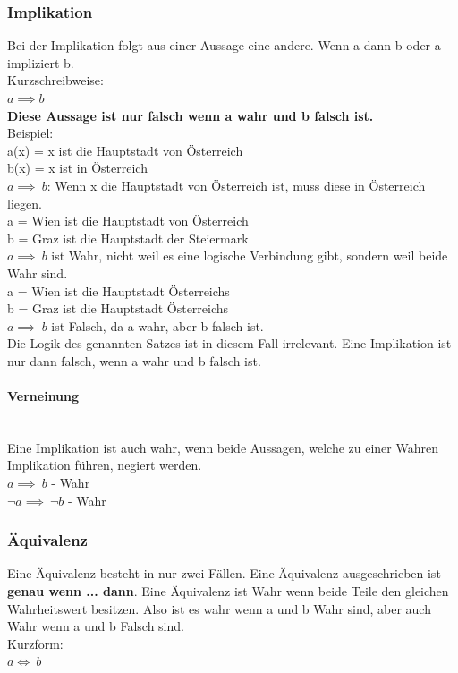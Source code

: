 \documentclass{article}
\newcommand{\paragraphlb}[1]{\paragraph{#1}\mbox{}\\}
\begin{document}
	\subsubsection{Implikation}
	Bei der Implikation folgt aus einer Aussage eine andere. Wenn a dann b oder a impliziert b.\\
	Kurzschreibweise: \\
	$a \implies b$ \\
	\textbf{Diese Aussage ist nur falsch wenn a wahr und b falsch ist.} \\
	Beispiel: \\
	a(x) = x ist die Hauptstadt von Österreich \\
	b(x) = x ist in Österreich \\
	$a \implies\ b$: Wenn x die Hauptstadt von Österreich ist, muss diese in Österreich liegen. \\
	a = Wien ist die Hauptstadt von Österreich \\
	b = Graz ist die Hauptstadt der Steiermark \\
	$a \implies\ b$ ist Wahr, nicht weil es eine logische Verbindung gibt, sondern weil beide Wahr sind. \\
	a = Wien ist die Hauptstadt Österreichs \\
	b = Graz ist die Hauptstadt Österreichs \\
	$a \implies\ b$ ist Falsch, da a wahr, aber b falsch ist. \\
	Die Logik des genannten Satzes ist in diesem Fall irrelevant. Eine Implikation ist nur dann falsch, wenn a wahr und b falsch ist.
	\paragraphlb{Verneinung}
	Eine Implikation ist auch wahr, wenn beide Aussagen, welche zu einer Wahren Implikation führen, negiert werden. \\
	$a \implies\ b$ - Wahr \\
	$\neg a\implies\ \neg b$ - Wahr
	\subsubsection{Äquivalenz}
	Eine Äquivalenz besteht in nur zwei Fällen. Eine Äquivalenz ausgeschrieben ist \textbf{genau wenn ... dann}. Eine Äquivalenz ist Wahr wenn beide Teile den gleichen Wahrheitswert besitzen. Also ist es wahr wenn a und b Wahr sind, aber auch Wahr wenn a und b Falsch sind. \\
	Kurzform: \\
	$a \iff\ b$
\end{document}
